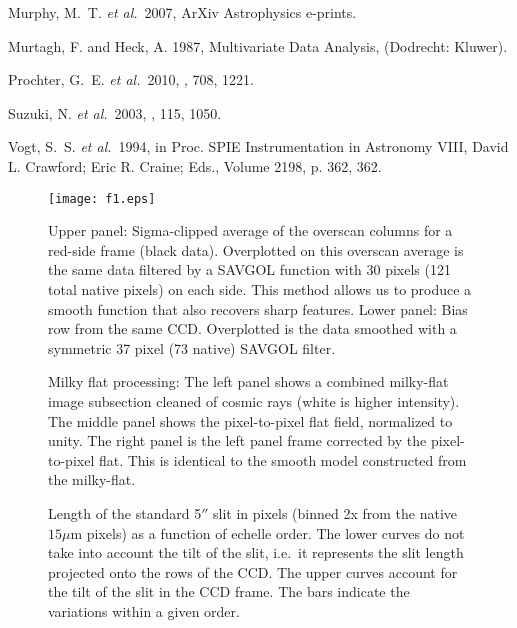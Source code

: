 \documentclass[12pt,preprint]{aastex}
\begin{document}
\begin{thebibliography}{}
{Murphy}, M.~T. {\it et al.}\  2007, ArXiv Astrophysics e-prints.

{Murtagh}, F. and {Heck}, A. 1987, { {Multivariate Data Analysis}}, (Dodrecht:
  Kluwer).

{Prochter}, G.~E. {\it et al.}\  2010, \apj, 708, 1221.

{Suzuki}, N. {\it et al.}\  2003, \pasp, 115, 1050.

{Vogt}, S.~S. {\it et al.}\  1994, in { Proc. SPIE Instrumentation in Astronomy
  VIII, David L. Crawford; Eric R. Craine; Eds., Volume 2198, p. 362}, 362.

\end{thebibliography}




\clearpage 
%
%
%

\begin{figure}
\texttt{[image: f1.eps]}
\caption{Upper panel: Sigma-clipped average of the overscan columns
for a red-side frame (black data).  Overplotted on this overscan
average is the same data filtered by a SAVGOL function with 30 pixels
(121 total native pixels)
on each side.  This method allows us to produce a smooth function
that also recovers sharp features. %
Lower panel: Bias row from the same CCD.  Overplotted is the 
data smoothed with a symmetric 37 pixel (73 native) SAVGOL filter.
}
\label{fig:bias}
\end{figure}

\begin{figure}
\caption{Milky flat processing: The left panel shows a combined milky-flat
image subsection cleaned of cosmic rays (white is higher intensity).  The
middle panel shows the pixel-to-pixel flat field, normalized to unity.  The
right panel is the left panel frame corrected by the pixel-to-pixel flat.
This is identical to the smooth model constructed from the milky-flat. }
\label{fig:mflat}
\end{figure}

\begin{figure}
\caption{Length of the standard 5$''$ slit in pixels (binned 2x from the
native $15\mu$m pixels) as a function of echelle order.  The lower curves do
not take into account the tilt of the slit, i.e.\ it represents the slit
length projected onto the rows of the CCD.  The upper curves account
for the tilt of the slit in the CCD frame. 
The bars indicate the variations within a given order.
}
\label{fig:slitlen}
\end{figure}
\end{document}
